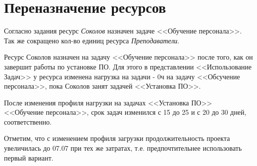 \chapter{Переназначение ресурсов}

Согласно задания ресурс \textit{Соколов} назначен задаче <<Обучение персонала>>. Так же сокращено кол-во единиц ресурса \textit{Преподаватели}.

Ресурс Соколов назначен на задачу <<Обучение персонала>> после того, как он завершит работы по установке ПО. Для этого в представлении <<Использование Задач>> у ресурса изменена нагрузка на задачи - 0ч на задачу <<Обсучение персонала>>, пока Соколов занят задачей <<Установка ПО>>.


После изменения профиля нагрузки на задачах <<Установка ПО>> <<Обучение персонала>>, срок задач изменился с 15 до 25 и с 20 до 30 дней, соответственно.


Отметим, что с изменением профиля загрузки продолжительность проекта увеличилась до 07.07 при тех же затратах, т.е. предпочтительнее использовать первый вариант.

